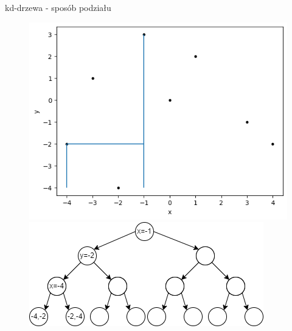 \documentclass[aspectratio=169,dvipsnames]{beamer}
\begin{document}
\begin{frame}{kd-drzewa - sposób podziału}
    \begin{figure}[H]
        \centering
          \begin{minipage}{0.5\textwidth}
            \centering
            \includegraphics[width=\linewidth]{images/plots/4.png}
          \end{minipage}%
          \begin{minipage}{0.5\textwidth}
            \centering
            \includegraphics[width=\linewidth]{images/trees/5.drawio.png}
          \end{minipage}
    \end{figure}
\end{frame}
\end{document}
